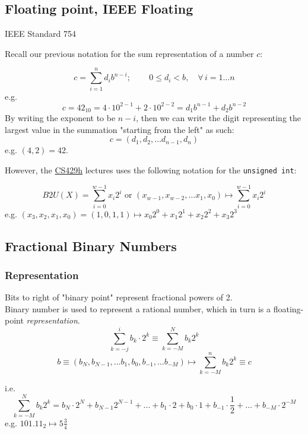 \documentclass[10pt]{amsart}
\begin{document}
\begin{multicols*}{2}
\section{Floating point, IEEE Floating}

IEEE Standard 754

Recall our previous notation for the sum representation of a number $c$:

\begin{equation}
c = \sum_{i=1}^n d_i b^{n-i}; \qquad \, 0 \leq d_i < b , \quad \forall \, i = 1\dots n 
\end{equation}
e.g.
\[
c = 42_{10} = 4 \cdot 10^{2-1} + 2\cdot 10^{2-2} = d_1 b^{n-1} + d_2 b^{n-2}
\]
By writing the exponent to be $n-i$, then we can write the digit representing the largest value in the summation "starting from the left" as such: \\
\[
c = (d_1, d_2, \dots d_{n-1}, d_n)
\]
e.g. $(4, 2) = 42$.

However, the \href{https://www.cs.utexas.edu/users/fussell/courses/cs429h/lectures/Lecture_4-429h.pdf}{CS429h} lectures uses the following notation for the \texttt{unsigned int}:

\[
B2U(X) = \sum_{i=0}^{w-1} x_i 2^i \text{ or } (x_{w-1}, x_{w-2}, \dots x_1, x_0) \mapsto \sum_{i=0}^{w-1} x_i 2^i
\]
e.g. $(x_3, x_2, x_1, x_0) = (1, 0, 1, 1) \mapsto x_0 2^0 + x_1 2^1 + x_2 2^2 + x_3 2^3$

\subsection{Fractional Binary Numbers}

\subsubsection{Representation}

Bits to right of "binary point" represent fractional powers of 2. \\
Binary number is used to represent a rational number, which in turn is a floating-point \emph{representation}. 
\begin{equation}
\sum_{k=-j}^i b_k \cdot 2^k \equiv \sum_{k=-M}^N b_k 2^k
\end{equation}
\begin{equation}
b \equiv (b_N, b_{N-1}, \dots b_1, b_0, b_{-1}, \dots b_{-M}) \mapsto \sum_{k=-M}^n b_k 2^k \equiv c
\end{equation}

i.e. 
\[
\sum_{k=-M}^N b_k 2^k = b_N \cdot 2^N + b_{N-1} 2^{N-1} + \dots + b_1 \cdot 2 + b_0 \cdot 1 + b_{-1} \cdot \frac{1}{2} + \dots + b_{-M} \cdot 2^{-M}
\]
e.g. $101.11_2 \mapsto 5 \frac{3}{4} $ 


\end{multicols*}
\end{document}
